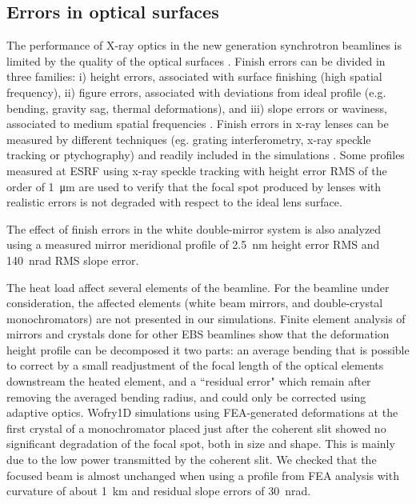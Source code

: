 \documentclass{iucr}              %
\begin{document}
\subsection{Errors in optical surfaces}

The performance of X-ray optics in the new generation synchrotron beamlines is limited by the quality of the optical surfaces \cite{lengeler1999,Yabashi}. Finish errors can be divided in three families: i) height errors, associated with surface finishing (high spatial frequency), ii) figure errors, associated with deviations from ideal profile (e.g. bending, gravity sag, thermal deformations), and iii) slope errors or waviness, associated to medium spatial frequencies \cite{srio1992, signorato1997}. Finish errors in x-ray lenses can be measured by different techniques (eg. grating interferometry, x-ray speckle tracking or ptychography) and readily included in the simulations \cite{Celestre:mo5214}. Some profiles measured at ESRF using x-ray speckle tracking \cite{berujon2020} with height error RMS of the order of \SI{1}{\micro\meter} are used to verify that the focal spot produced by lenses with realistic errors is not degraded with respect to the ideal lens surface. 


The effect of finish errors in the white double-mirror system is also analyzed using a measured mirror meridional profile of \SI{2.5}{\nano\meter} height error RMS and \SI{140}{\nano\radian} RMS slope error. 

The heat load affect several elements of the beamline. For the beamline under consideration, the affected elements (white beam mirrors, and double-crystal monochromators) are not presented in our simulations. Finite element analysis of mirrors and crystals done for other EBS beamlines \cite{Brumund} show that the deformation height profile can be decomposed it two parts: an average bending that is possible to correct by a small readjustment of the focal length of the optical elements downstream the heated element, and a ``residual error" which remain after removing the averaged bending radius, and could only be corrected using adaptive optics. Wofry1D simulations using FEA-generated deformations at the first crystal of a monochromator placed just after the coherent slit showed no significant degradation of the focal spot, both in size and shape. This is mainly due to the low power transmitted by the coherent slit. We checked that the focused beam is almost unchanged when using a profile from FEA analysis with curvature of about \SI{1}{\kilo\meter} and residual slope errors of \SI{30}{\nano\radian}. 
\end{document}
